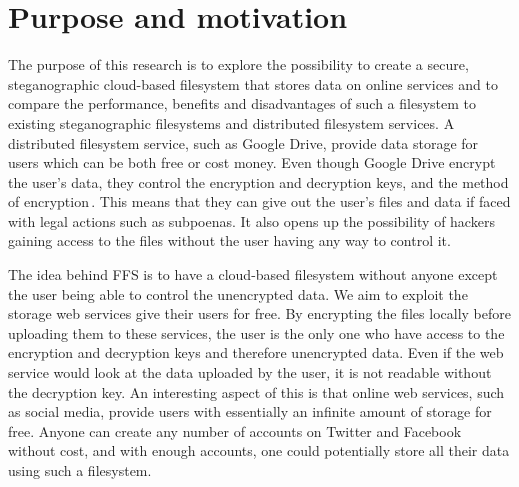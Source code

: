 
\section{Purpose and motivation}

The purpose of this research is to explore the possibility to create a secure, steganographic cloud-based filesystem that stores data on online services and to compare the performance, benefits and disadvantages of such a filesystem to existing steganographic filesystems and distributed filesystem services. A distributed filesystem service, such as Google Drive, provide data storage for users which can be both free or cost money. Even though Google Drive encrypt the user's data, they control the encryption and decryption keys, and the method of encryption\,\cite{johnsonGoogleDriveSecure2021}. This means that they can give out the user's files and data if faced with legal actions such as subpoenas. It also opens up the possibility of hackers gaining access to the files without the user having any way to control it.

The idea behind FFS is to have a cloud-based filesystem without anyone except the user being able to control the unencrypted data. We aim to exploit the storage web services give their users for free. By encrypting the files locally before uploading them to these services, the user is the only one who have access to the encryption and decryption keys and therefore unencrypted data. Even if the web service would look at the data uploaded by the user, it is not readable without the decryption key. An interesting aspect of this is that online web services, such as social media, provide users with essentially an infinite amount of storage for free. Anyone can create any number of accounts on Twitter and Facebook without cost, and with enough accounts, one could potentially store all their data using such a filesystem.

